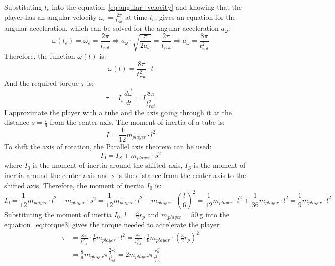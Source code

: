 Substituting $t_e$ into the equation~\ref{eq:angular_velocity} and knowing that the player has an angular velocity $\omega_e=\frac{2\pi}{t_{rot}}$ at time $t_e$, gives an equation for the angular acceleration, which can be solved for the angular acceleration $a_\omega$:
\begin{equation}
    \label{eq:angular_acceleration}
    \omega(t_e) = \omega_e = \frac{2\pi}{t_{rot}} \Rightarrow a_{\omega} \cdot \sqrt {\frac{\pi}{2a_{\omega}}} = \frac{2\pi}{t_{rot}} \Rightarrow a_{\omega} = \frac{8\pi}{t_{rot}^2}
\end{equation}
Therefore, the function $\omega(t)$ is:
\begin{equation}
    \label{eq:angular_velocity_function}
    \omega(t) = \frac{8\pi}{t_{rot}^2} \cdot t
\end{equation}
And the required torque $\tau$ is:
\begin{equation}
    \label{eq:torque3}
    \tau = I_s \frac{d\vec{\omega}}{dt} = I \frac{8\pi}{t_{rot}^2}
\end{equation}
I approximate the player with a tube and the axis going through it at the distance $s=\frac{l}{6}$ from the center axis.
The moment of inertia of a tube is:
\begin{equation}
    \label{eq:moment_of_inertia}
    I = \frac{1}{12} m_{player} \cdot l^2
\end{equation}
To shift the axis of rotation, the Parallel axis theorem can be used:
\begin{equation}
    \label{eq:parallel_axis_theorem}
    I_0 = I_{S} + m_{player} \cdot s^2
\end{equation}
where $I_0$ is the moment of inertia around the shifted axis, $I_{S}$ is the moment of inertia around the center axis and $s$ is the distance from the center axis to the shifted axis.
Therefore, the moment of inertia $I_0$ is:
\begin{equation}
    \label{eq:moment_of_inertia_shifted}
    I_0 = \frac{1}{12} m_{player} \cdot l^2 + m_{player} \cdot s^2 = \frac{1}{12} m_{player} \cdot l^2 + m_{player} \cdot \left(\frac{l}{6}\right)^2 = \frac{1}{12} m_{player} \cdot l^2 + \frac{1}{36} m_{player} \cdot l^2 = \frac{1}{9} m_{player} \cdot l^2
\end{equation}
Substituting the moment of inertia $I_0$, $l=\frac{3}{2}r_p$ and $m_{player}=\qty[per-mode=symbol]{50}{\g}$ into the equation~\ref{eq:torque3} gives the torque needed to accelerate the player:
\begin{equation}
    \label{eq:torque4}
    \begin{split}
        \tau &= \frac{8\pi}{t_{rot}^2} \cdot \frac{1}{9} m_{player} \cdot l^2 = \frac{8\pi}{t_{rot}^2} \cdot \frac{1}{9} m_{player} \cdot \left(\frac{3}{2}r_p\right)^2\\
        &= \frac{8}{9}m_{player}\pi\frac{\frac{9}{4}r_p^2}{t_{rot}^2}=2m_{player}\pi\frac{r_p^2}{t_{rot}^2}
    \end{split}
\end{equation}
